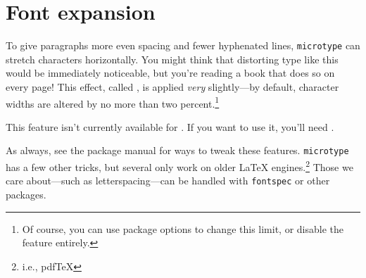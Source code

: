 \section{Font expansion}

To give paragraphs more even spacing and fewer hyphenated lines,
\texttt{microtype} can stretch characters horizontally.
You might think that distorting type like this would be immediately
noticeable,
but you're reading a book that does so on every page!
This effect, called ,
is applied \emph{very} slightly---by default,
character widths are altered by no more than two percent.\punckern\footnote{%
Of course, you can use package options to change this limit,
or disable the feature entirely.}

This feature isn't currently available for \XeLaTeX{}.
If you want to use it, you'll need \LuaLaTeX{}.

\exercises{}

As always, see the package manual for ways to tweak these features.
\texttt{microtype} has a few other tricks,
but several only work on older \LaTeX{} engines.\punckern\footnote{i.e., pdf\TeX}
Those we care about---such as letterspacing---can be handled with
\texttt{fontspec} or other packages.
